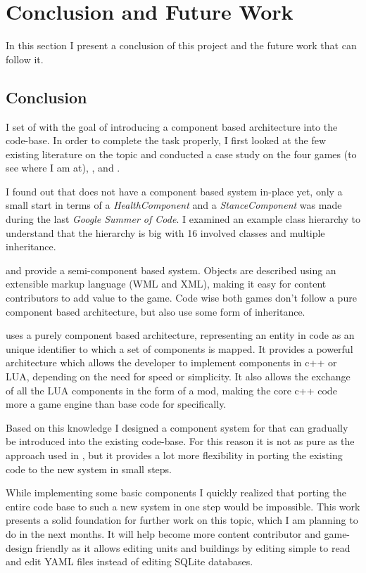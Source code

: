 \section{Conclusion and Future Work}
In this section I present a conclusion of this project and the future work that can follow it.

\subsection{Conclusion}
I set of with the goal of introducing a component based architecture into the \UH{} code-base. In order to complete the
task properly, I first looked at the few existing literature on the topic and conducted a case study on the four \OS{}
games \UH{} (to see where I am at), \BOW{}, \GLEST{} and \AD{}.

I found out that \UH{} does not have a component based system in-place yet, only a small start in terms of a
\textit{HealthComponent} and a \textit{StanceComponent} was made during the last \textit{Google Summer of Code}. I
examined an example class hierarchy to understand that the hierarchy is big with 16 involved classes and multiple
inheritance.

\BOW{} and \GLEST{} provide a semi-component based system. Objects are described using an extensible markup language
(WML and XML), making it easy for content contributors to add value to the game. Code wise both games don't follow a
pure component based architecture, but also use some form of inheritance.

\AD{} uses a purely component based architecture, representing an entity in code as an unique identifier to which a set
of components is mapped. It provides a powerful architecture which allows the developer to implement components in c++
or LUA, depending on the need for speed or simplicity. It also allows the exchange of all the LUA components in the form
of a mod, making the core c++ code more a game engine than base code for \AD{} specifically.

Based on this knowledge I designed a component system for \UH{} that can gradually be introduced into the existing
code-base. For this reason it is not as pure as the approach used in \AD{}, but it provides a lot more flexibility in
porting the existing code to the new system in small steps.

While implementing some basic components I quickly realized that porting the entire code base to such a new system in
one step would
be impossible. This work presents a solid foundation for further work on this topic, which I am planning to do in the
next months. It will help \UH{} become more content contributor and game-design friendly as it allows editing units and
buildings by editing simple to read and edit YAML files instead of editing SQLite databases.


